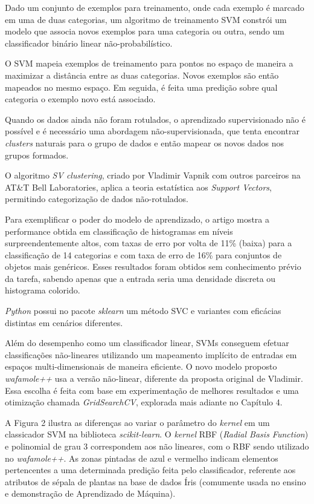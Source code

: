 Dado um conjunto de exemplos para treinamento, onde cada exemplo é marcado em uma de duas categorias, um algoritmo de treinamento SVM constrói um modelo que associa novos exemplos para uma categoria ou outra, sendo um classificador binário linear não-probabilístico. 
 
O SVM mapeia exemplos de treinamento para pontos no espaço de maneira a maximizar a distância entre as duas categorias. Novos exemplos são então mapeados no mesmo espaço. Em seguida, é feita uma predição sobre qual categoria o exemplo novo está associado.

Quando os dados ainda não foram rotulados, o aprendizado supervisionado não é possível e é necessário uma abordagem não-supervisionada, que tenta encontrar \textit{clusters} naturais para o grupo de dados e então mapear os novos dados nos grupos formados. 

O algoritmo \textit{SV clustering}, criado por Vladimir Vapnik com
outros parceiros na AT\&T Bell Laboratories, aplica a teoria estatística aos \textit{Support Vectors}, permitindo categorização de dados não-rotulados.

Para exemplificar o poder do modelo de aprendizado, o artigo \cite{vapnik_svm_support} mostra a performance obtida em classificação de histogramas em níveis surpreendentemente altos, com taxas de erro por volta de 11\% (baixa) para a classificação de 14 categorias e com taxa de erro de 16\% para conjuntos de objetos mais genéricos. Esses resultados foram obtidos sem conhecimento prévio da tarefa, sabendo apenas que a entrada seria uma densidade discreta ou histograma colorido.

\textit{Python} possui no pacote \textit{sklearn} um método SVC e variantes com eficácias distintas em cenários diferentes.

Além do desempenho como um classificador linear, SVMs conseguem efetuar classificações não-lineares utilizando um mapeamento implícito de entradas em espaços multi-dimensionais de maneira eficiente. O novo modelo proposto \textit{wafamole++} usa a versão não-linear, diferente da proposta original de Vladimir. Essa escolha é feita com base em experimentação de melhores resultados e uma otimização chamada \textit{GridSearchCV}, explorada mais adiante no Capítulo 4.

A Figura 2 ilustra as diferenças ao variar o parâmetro do \textit{kernel} em um classicador SVM na biblioteca \textit{scikit-learn}. O \textit{kernel} RBF (\textit{Radial Basis Function}) e polinomial de grau 3 correspondem aos não lineares, com o RBF sendo utilizado no \textit{wafamole++}. As zonas pintadas de azul e vermelho indicam elementos pertencentes a uma determinada predição feita pelo classificador, referente aos atributos de sépala de plantas na base de dados Íris (comumente usada no ensino e demonstração de Aprendizado de Máquina).

